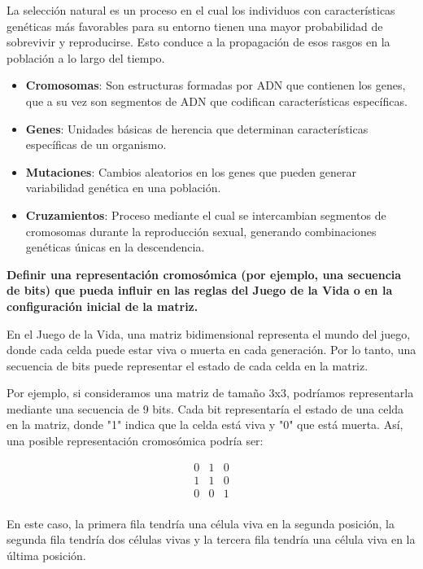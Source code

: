 La selección natural es un proceso en el cual los individuos con características genéticas más favorables para su entorno tienen una mayor probabilidad de sobrevivir y reproducirse. Esto conduce a la propagación de esos rasgos en la población a lo largo del tiempo.

\begin{itemize}
    \item \textbf{Cromosomas}: Son estructuras formadas por ADN que contienen los genes, que a su vez son segmentos de ADN que codifican características específicas.
  
    \item \textbf{Genes}: Unidades básicas de herencia que determinan características específicas de un organismo.
  
    \item \textbf{Mutaciones}: Cambios aleatorios en los genes que pueden generar variabilidad genética en una población.
  
    \item \textbf{Cruzamientos}: Proceso mediante el cual se intercambian segmentos de cromosomas durante la reproducción sexual, generando combinaciones genéticas únicas en la descendencia.
\end{itemize}

\textbf{Definir una representación cromosómica (por ejemplo, una secuencia de bits) que pueda influir en las reglas del Juego de la Vida o en la configuración inicial de la matriz.}

 En el Juego de la Vida, una matriz bidimensional representa el mundo del juego, donde cada celda puede estar viva o muerta en cada generación. Por lo tanto, una secuencia de bits puede representar el estado de cada celda en la matriz.

Por ejemplo, si consideramos una matriz de tamaño 3x3, podríamos representarla mediante una secuencia de 9 bits. Cada bit representaría el estado de una celda en la matriz, donde "1" indica que la celda está viva y "0" que está muerta. Así, una posible representación cromosómica podría ser:

\[
\begin{matrix}
    0 & 1 & 0 \\
    1 & 1 & 0 \\
    0 & 0 & 1 \\
    \end{matrix}
\]

En este caso, la primera fila tendría una célula viva en la segunda posición, la segunda fila tendría dos células vivas y la tercera fila tendría una célula viva en la última posición.


